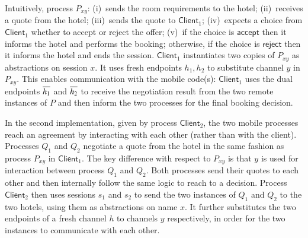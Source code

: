 \documentclass[preprint,11pt]{elsarticle}
\newcommand{\accept}{\mathsf{accept}}
\newcommand{\reject}{\mathsf{reject}}
\newcommand{\Client}{\mathsf{Client}}
\begin{document}
{{		Intuitively, process $P_{xy}$:
		(i)~sends the room requirements to the hotel;
		(ii)~receives a quote from the hotel;
		(iii)~sends the quote to  $\Client_1$;
		(iv)~expects a choice from   $\Client_1$ whether to accept or reject the offer;
		(v)~if the choice is $\accept$ then it informs the hotel and performs the booking;
		otherwise, if the choice is $\reject$ then it informs the hotel and ends the session.
				$\Client_1$ instantiates two copies of  $P_{xy}$ as abstractions
		on session $x$. It uses 
		fresh endpoints $h_1, h_2$ to substitute channel $y$
		in $P_{xy}$. This enables communication with the mobile code(s): 
		$\Client_1$ uses the dual endpoints $\overline{h_1}$ and $\overline{h_2}$
		to receive the negotiation
		result from the two remote instances of $P$ and then inform the two
		processes for the final booking decision.

In the second implementation, given by process $\Client_2$,  
the two mobile processes reach an agreement
by interacting with each other (rather than with the client).
Processes $Q_1$ and $Q_2$  negotiate a quote from the
		hotel in the same fashion as process $P_{xy}$ in $\Client_1$.
		The key difference with respect to $P_{xy}$ is that $y$ is used for
		interaction between process $Q_1$ and $Q_2$. Both processes send
		their quotes to each other and then internally follow the same
		logic to reach to a decision.
		Process  $\Client_2$ then uses sessions $s_1$ and $s_2$ to send the two
		instances of $Q_1$ and $Q_2$ to the two hotels, using them 
	 as abstractions
		on name $x$. It further substitutes
		the two endpoints of a fresh channel $h$ to channels $y$ respectively,
		in order for the two instances to communicate with each other.



%
%

}}
\end{document}
